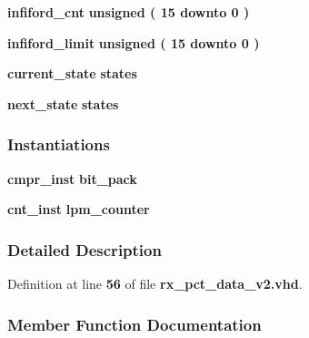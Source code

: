 \begin{DoxyCompactItemize}
{\bf infiford\+\_\+cnt} {\bfseries \textcolor{comment}{unsigned}\textcolor{vhdlchar}{ }\textcolor{vhdlchar}{(}\textcolor{vhdlchar}{ }\textcolor{vhdlchar}{ } \textcolor{vhdldigit}{15} \textcolor{vhdlchar}{ }\textcolor{keywordflow}{downto}\textcolor{vhdlchar}{ }\textcolor{vhdlchar}{ } \textcolor{vhdldigit}{0} \textcolor{vhdlchar}{ }\textcolor{vhdlchar}{)}\textcolor{vhdlchar}{ }} 
\item 
{\bf infiford\+\_\+limit} {\bfseries \textcolor{comment}{unsigned}\textcolor{vhdlchar}{ }\textcolor{vhdlchar}{(}\textcolor{vhdlchar}{ }\textcolor{vhdlchar}{ } \textcolor{vhdldigit}{15} \textcolor{vhdlchar}{ }\textcolor{keywordflow}{downto}\textcolor{vhdlchar}{ }\textcolor{vhdlchar}{ } \textcolor{vhdldigit}{0} \textcolor{vhdlchar}{ }\textcolor{vhdlchar}{)}\textcolor{vhdlchar}{ }} 
\item 
{\bf current\+\_\+state} {\bfseries {\bfseries {\bf states}} \textcolor{vhdlchar}{ }} 
\item 
{\bf next\+\_\+state} {\bfseries {\bfseries {\bf states}} \textcolor{vhdlchar}{ }} 
\end{DoxyCompactItemize}
\subsubsection*{Instantiations}
 \begin{DoxyCompactItemize}
\item 
{\bf cmpr\+\_\+inst}  {\bfseries bit\+\_\+pack}   
\item 
{\bf cnt\+\_\+inst}  {\bfseries lpm\+\_\+counter}   
\end{DoxyCompactItemize}


\subsubsection{Detailed Description}


Definition at line {\bf 56} of file {\bf rx\+\_\+pct\+\_\+data\+\_\+v2.\+vhd}.



\subsubsection{Member Function Documentation}
